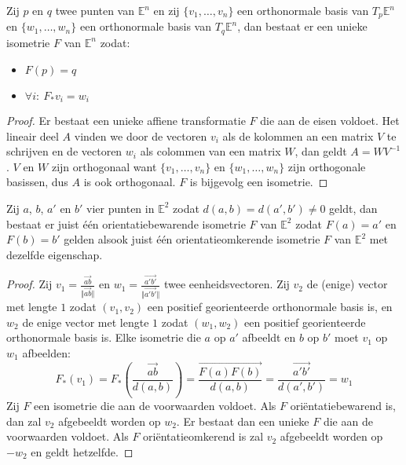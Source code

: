 \documentclass[main.tex]{subfiles}
\begin{document}
\begin{st}
  \label{st:bestaan-isometrie}
  Zij $p$ en $q$ twee punten van $\mathbb{E}^{n}$ en zij $\{ v_{1},\dotsc,v_{n} \}$ een orthonormale basis van $T_{p}\mathbb{E}^{n}$ en $\{ w_{1},\dotsc,w_{n} \}$ een orthonormale basis van $T_{q}\mathbb{E}^{n}$, dan bestaat er een unieke isometrie $F$ van $\mathbb{E}^{n}$ zodat:
  \begin{itemize}
  \item $F(p) = q$
  \item $\forall i:\ F_{*}v_{i} = w_{i}$
  \end{itemize}
  \begin{proof}
    Er bestaat een unieke affiene transformatie $F$ die aan de eisen voldoet.
    Het lineair deel $A$ vinden we door de vectoren $v_{i}$ als de kolommen an een matrix $V$ te schrijven en de vectoren $w_{i}$ als colommen van een matrix $W$, dan geldt $A=WV^{-1}$.
  $V$ en $W$ zijn orthogonaal want $\{ v_{1},\dotsc,v_{n} \}$ en $\{ w_{1},\dotsc,w_{n} \}$ zijn orthogonale basissen\needed, dus $A$ is ook orthogonaal\needed.
  $F$ is bijgevolg een isometrie.
  \end{proof}
\end{st}

\begin{gev}
  Zij $a$, $b$, $a'$ en $b'$ vier punten in $\mathbb{E}^{2}$ zodat $d(a,b) = d(a',b') \neq 0$ geldt, dan bestaat er juist \'e\'en orientatiebewarende isometrie $F$ van $\mathbb{E}^{2}$ zodat $F(a) = a'$ en $F(b) = b'$ gelden alsook juist \'e\'en orientatieomkerende isometrie $F$ van $\mathbb{E}^{2}$ met dezelfde eigenschap.

  \begin{proof}
    Zij $v_{1} = \frac{\overrightarrow{ab}}{\Vert \overrightarrow{ab} \Vert}$ en $w_{1} = \frac{\overrightarrow{a'b'}}{\Vert \overrightarrow{a'b'} \Vert}$ twee eenheidsvectoren.
    Zij $v_{2}$ de (enige\needed) vector met lengte $1$ zodat $(v_{1},v_{2})$ een positief georienteerde orthonormale basis is, en $w_{2}$ de enige vector met lengte $1$ zodat $(w_{1},w_{2})$ een positief georienteerde orthonormale basis is.
    Elke isometrie die $a$ op $a'$ afbeeldt en $b$ op $b'$ moet $v_{1}$ op $w_{1}$ afbeelden:
    \[
    F_{*}(v_{1})
    = F_{*}\left(\frac{\overrightarrow{ab}}{d(a,b)}\right)
    = \frac{\overrightarrow{F(a)F(b)}}{d(a,b)}
    = \frac{\overrightarrow{a'b'}}{d(a',b')}
    = w_{1}
    \]
    Zij $F$ een isometrie die aan de voorwaarden voldoet.
    Als $F$ ori\"entatiebewarend is, dan zal $v_{2}$ afgebeeldt worden op $w_{2}$.
    Er bestaat dan een unieke $F$ die aan de voorwaarden voldoet.
    Als $F$ ori\"entatieomkerend is zal $v_{2}$ afgebeeldt worden op $-w_{2}$ en geldt hetzelfde.
  \end{proof}
\end{gev}
\end{document}
